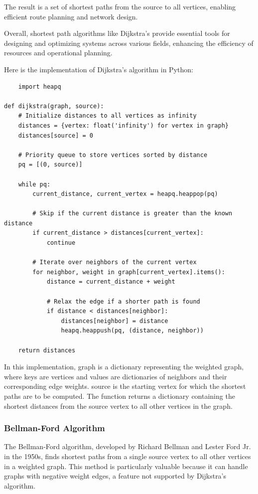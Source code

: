 \documentclass[12pt]{book} %
\begin{document}
The result is a set of shortest paths from the source to all vertices, enabling efficient route planning and network design.

Overall, shortest path algorithms like Dijkstra's provide essential tools for designing and optimizing systems across various fields, enhancing the efficiency of resources and operational planning.


Here is the implementation of Dijkstra's algorithm in Python:
\FloatBarrier
\begin{lstlisting}
    import heapq

def dijkstra(graph, source):
    # Initialize distances to all vertices as infinity
    distances = {vertex: float('infinity') for vertex in graph}
    distances[source] = 0
    
    # Priority queue to store vertices sorted by distance
    pq = [(0, source)]
    
    while pq:
        current_distance, current_vertex = heapq.heappop(pq)
        
        # Skip if the current distance is greater than the known distance
        if current_distance > distances[current_vertex]:
            continue
            
        # Iterate over neighbors of the current vertex
        for neighbor, weight in graph[current_vertex].items():
            distance = current_distance + weight
            
            # Relax the edge if a shorter path is found
            if distance < distances[neighbor]:
                distances[neighbor] = distance
                heapq.heappush(pq, (distance, neighbor))
    
    return distances
\end{lstlisting}
In this implementation, graph is a dictionary representing the weighted graph, where keys are vertices and values are dictionaries of neighbors and their corresponding edge weights. source is the starting vertex for which the shortest paths are to be computed. The function returns a dictionary containing the shortest distances from the source vertex to all other vertices in the graph.

\subsubsection{Bellman-Ford Algorithm}
The Bellman-Ford algorithm, developed by Richard Bellman and Lester Ford Jr. in the 1950s, finds shortest paths from a single source vertex to all other vertices in a weighted graph. This method is particularly valuable because it can handle graphs with negative weight edges, a feature not supported by Dijkstra's algorithm.
\end{document}
